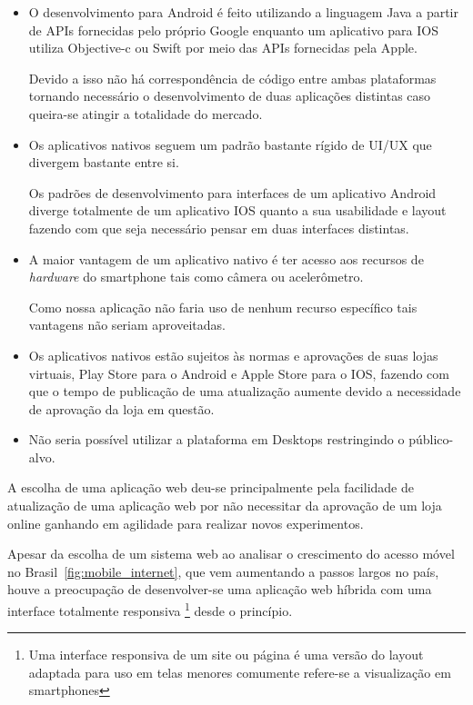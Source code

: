 \begin{itemize}
\item O desenvolvimento para Android é feito utilizando a linguagem Java a partir de APIs fornecidas pelo próprio Google enquanto um aplicativo para IOS utiliza Objective-c ou Swift por meio das APIs fornecidas pela Apple.
\par Devido a isso não há correspondência de código entre ambas plataformas tornando necessário o desenvolvimento de duas aplicações distintas caso queira-se atingir a totalidade do mercado.
\item Os aplicativos nativos seguem um padrão bastante rígido de UI/UX que divergem bastante entre si.
\par Os padrões de desenvolvimento para interfaces de um aplicativo Android diverge totalmente de um aplicativo IOS quanto a sua usabilidade e layout fazendo com que seja necessário pensar em duas interfaces distintas.
\item A maior vantagem de um aplicativo nativo é ter acesso aos recursos de \emph{hardware} do smartphone tais como câmera ou acelerômetro.
\par Como nossa aplicação não faria uso de nenhum recurso específico tais vantagens não seriam aproveitadas.
\item Os aplicativos nativos estão sujeitos às normas e aprovações de suas lojas virtuais, Play Store para o Android e Apple Store para o IOS, fazendo com que o tempo de publicação de uma atualização aumente devido a necessidade de aprovação da loja em questão.
\item Não seria possível utilizar a plataforma em Desktops restringindo o público-alvo.
\end{itemize}
\par A escolha de uma aplicação web deu-se principalmente pela facilidade de atualização de uma aplicação web por não necessitar da aprovação de um loja online ganhando em agilidade para realizar novos experimentos.
\par Apesar da escolha de um sistema web ao analisar o crescimento do acesso móvel no Brasil~\ref{fig:mobile_internet}, que vem aumentando a passos largos no país, houve a preocupação de desenvolver-se uma aplicação web híbrida com uma interface totalmente responsiva \footnote{ Uma interface responsiva de um site ou página é uma versão do layout adaptada para uso em telas menores comumente refere-se a visualização em smartphones} desde o princípio.
